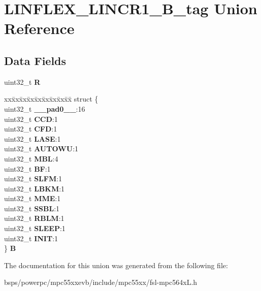 \hypertarget{unionLINFLEX__LINCR1__32B__tag}{}\section{L\+I\+N\+F\+L\+E\+X\+\_\+\+L\+I\+N\+C\+R1\+\_\+B\+\_\+tag Union Reference}
\label{unionLINFLEX__LINCR1__32B__tag}
\subsection*{Data Fields}
\begin{DoxyCompactItemize}
\item 
\mbox{\label{unionLINFLEX__LINCR1__32B__tag_a0cf5c5c73ef45801450b86e666938779}} 
uint32\+\_\+t {\bfseries R}
\item 
\mbox{\label{unionLINFLEX__LINCR1__32B__tag_ab9b8cc412b5f2eccdd9bc8a3d299dd15}} 
\begin{tabbing}
xx\=xx\=xx\=xx\=xx\=xx\=xx\=xx\=xx\=\kill
struct \{\\
\>uint32\_t {\bfseries \_\_pad0\_\_}:16\\
\>uint32\_t {\bfseries CCD}:1\\
\>uint32\_t {\bfseries CFD}:1\\
\>uint32\_t {\bfseries LASE}:1\\
\>uint32\_t {\bfseries AUTOWU}:1\\
\>uint32\_t {\bfseries MBL}:4\\
\>uint32\_t {\bfseries BF}:1\\
\>uint32\_t {\bfseries SLFM}:1\\
\>uint32\_t {\bfseries LBKM}:1\\
\>uint32\_t {\bfseries MME}:1\\
\>uint32\_t {\bfseries SSBL}:1\\
\>uint32\_t {\bfseries RBLM}:1\\
\>uint32\_t {\bfseries SLEEP}:1\\
\>uint32\_t {\bfseries INIT}:1\\
\} {\bfseries B}\\

\end{tabbing}\end{DoxyCompactItemize}


The documentation for this union was generated from the following file\+:\begin{DoxyCompactItemize}
\item 
bsps/powerpc/mpc55xxevb/include/mpc55xx/fsl-\/mpc564x\+L.\+h\end{DoxyCompactItemize}
